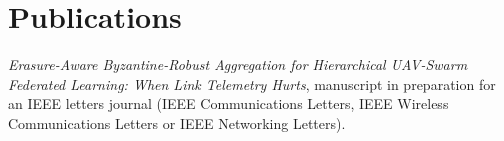 \chapter*{Publications}

\begin{enumerate}[label={[P\arabic*]}, leftmargin=12mm]
\item \textit{Erasure-Aware Byzantine-Robust Aggregation for Hierarchical UAV-Swarm
  Federated Learning: When Link Telemetry Hurts}, manuscript in preparation for an IEEE
  letters journal (IEEE Communications Letters, IEEE Wireless Communications Letters
  or IEEE Networking Letters).
\end{enumerate}
